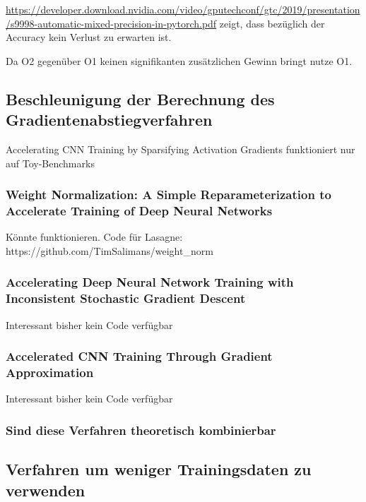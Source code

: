 \url{https://developer.download.nvidia.com/video/gputechconf/gtc/2019/presentation/s9998-automatic-mixed-precision-in-pytorch.pdf} zeigt, dass bezüglich der Accuracy kein Verlust zu erwarten ist.

Da O2 gegenüber O1 keinen signifikanten zusätzlichen Gewinn bringt nutze O1.
\subsection{Beschleunigung der Berechnung des Gradientenabstiegverfahren}


Accelerating CNN Training by Sparsifying Activation Gradients funktioniert nur auf Toy-Benchmarks 


\subsubsection{Weight Normalization: A Simple Reparameterization
to Accelerate Training of Deep Neural Networks}

Könnte funktionieren. Code für Lasagne: https://github.com/TimSalimans/weight\_norm


\subsubsection{Accelerating Deep Neural Network Training with Inconsistent Stochastic Gradient Descent}

Interessant bisher kein Code verfügbar

\subsubsection{Accelerated CNN Training Through Gradient Approximation }

Interessant bisher kein Code verfügbar


\subsubsection{Sind diese Verfahren theoretisch kombinierbar}
\subsection{Verfahren um weniger Trainingsdaten zu verwenden}


